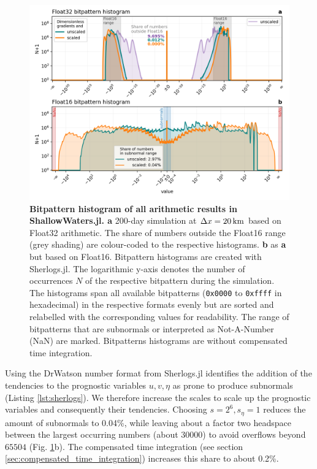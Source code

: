 \begin{figure}[tbhp]
	\includegraphics[width=1\textwidth]{Figures/a64fx/bitpattern_hist.png}
	\caption{\textbf{Bitpattern histogram of all arithmetic results in ShallowWaters.jl. a}
	200-day simulation at $\Delta x = 20\operatorname{km}$ based on Float32 arithmetic. The share of numbers
	outside the Float16 range (grey shading) are colour-coded to the respective histograms. \textbf{b} as \textbf{a}
	but based on Float16. Bitpattern histograms are created with Sherlogs.jl. The logarithmic y-axis denotes the
	number of occurrences $N$ of the respective bitpattern during the simulation. The histograms span all
	available bitpatterns (\texttt{0x0000} to \texttt{0xffff} in hexadecimal) in the respective formats evenly
	but are sorted and relabelled with the corresponding values for readability. The range of bitpatterns that
	are subnormals or interpreted as Not-A-Number (NaN) are marked. Bitpatterns histograms are without
	compensated time integration.}
	\label{fig:a64fx_bitpatternhist}
\end{figure}

Using the DrWatson number format from Sherlogs.jl identifies the addition of the tendencies to the
prognostic variables $u,v,\eta$ as prone to produce subnormals (Listing \ref{lst:sherlogs}). We therefore
increase the scales  to scale up the prognostic variables and consequently their tendencies. Choosing
$s = 2^6, s_\eta = 1$ reduces the amount of subnormals to 0.04\%, while leaving about a factor two
headspace between the largest occurring numbers (about $30000$) to avoid overflows beyond $65504$
(Fig. \ref{fig:a64fx_bitpatternhist}b). The compensated time integration (see section
\ref{sec:compensated_time_integration}) increases this share to about 0.2\%.

